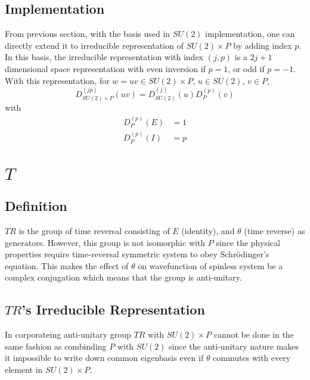 \documentclass[preprint, 12pt]{revtex4-2}
\numberwithin{equation}{section}
\begin{document}
\subsection{Implementation}
From previous section, with the basis used in $SU(2)$ implementation, one can directly extend it to irreducible representation of $SU(2)\times P$ by adding index $p$. In this basis, the irreducible representation with index $(j, p)$ is a $2j+1$ dimensional space representation with even inversion if $p=1$, or odd if $p=-1$. With this representation, for $w=uv\in SU(2)\times P$, $u \in SU(2)$, $v\in P$,
\begin{equation}
    D_{SU(2)\times P}^{(jp)}(uv) = D_{SU(2)}^{(j)}(u)D_P^{(p)}(v)
\end{equation}
with
\begin{equation}
    \begin{aligned}
        D_P^{(p)}(E) &= 1 \\
        D_P^{(p)}(I) &= p
    \end{aligned}
\end{equation}

\section{$T$}

\subsection{Definition}
$TR$ is the group of time reversal consisting of $E$ (identity), and $\theta$ (time reverse) as generators. However, this group is not isomorphic with $P$ since the physical properties require time-reversal symmetric system to obey Schr\"odinger's equation. This makes the effect of $\theta$ on wavefunction of spinless system be a complex conjugation which means that the group is anti-unitary.

\subsection{$TR$'s Irreducible Representation}
In corporateing anti-unitary group $TR$ with $SU(2)\times P$ cannot be done in the same fashion as combinding $P$ with $SU(2)$ since the anti-unitary nature makes it impossible to write down common eigenbasis even if $\theta$ commutes with every element in $SU(2)\times P$.
\end{document}

